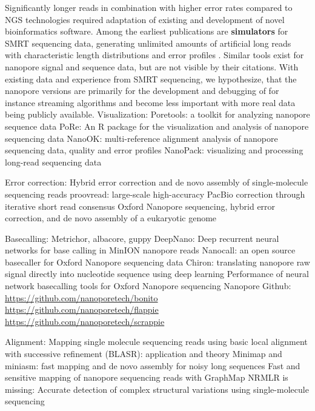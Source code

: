 Significantly longer reads in combination with higher error rates compared to NGS technologies required adaptation of existing and development of novel bioinformatics software.
Among the earliest publications are \textbf{simulators} for SMRT sequencing data, generating unlimited amounts of artificial long reads with characteristic length distributions and error profiles \cite{Ono2013, Stoecker2016}.
Similar tools exist for nanopore signal and sequence data, but are not visible by their citations.
With existing data and experience from SMRT sequencing, we hypothesize, that the nanopore versions are primarily for the development and debugging of for instance streaming algorithms and become less important with more real data being publicly available.
Visualization:
Poretools: a toolkit for analyzing nanopore sequence data \cite{Loman2014}
PoRe: An R package for the visualization and analysis of nanopore sequencing data \cite{Watson2014}
NanoOK: multi-reference alignment analysis of nanopore sequencing data, quality and error profiles \cite{Leggett2016}
NanoPack: visualizing and processing long-read sequencing data \cite{DeCoster2018}

Error correction:
Hybrid error correction and de novo assembly of single-molecule sequencing reads \cite{Koren2012}
proovread: large-scale high-accuracy PacBio correction through iterative short read consensus \cite{Hackl2014}
Oxford Nanopore sequencing, hybrid error correction, and de novo assembly of a eukaryotic genome \cite{Goodwin2015}

Basecalling:
Metrichor, albacore, guppy
DeepNano: Deep recurrent neural networks for base calling in MinION nanopore reads \cite{Boza2017}
Nanocall: an open source basecaller for Oxford Nanopore sequencing data \cite{David2017}
Chiron: translating nanopore raw signal directly into nucleotide sequence using deep learning \cite{Teng2018}
Performance of neural network basecalling tools for Oxford Nanopore sequencing \cite{Wick2019}
Nanopore Github:
\url{https://github.com/nanoporetech/bonito}
\url{https://github.com/nanoporetech/flappie}
\url{https://github.com/nanoporetech/scrappie}

Alignment:
Mapping single molecule sequencing reads using basic local alignment with successive refinement (BLASR): application and theory \cite{Chaisson2012}
Minimap and miniasm: fast mapping and de novo assembly for noisy long sequences \cite{Li2016}
Fast and sensitive mapping of nanopore sequencing reads with GraphMap \cite{Sovic2016}
NRMLR is missing: Accurate detection of complex structural variations using single-molecule sequencing \cite{Sedlazeck2018}




